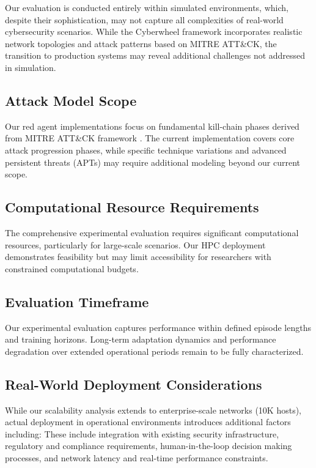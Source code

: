\documentclass[12pt,oneside]{article}
\begin{document}
Our evaluation is conducted entirely within simulated environments, which, despite their sophistication, may not capture all complexities of real-world cybersecurity scenarios. While the Cyberwheel framework incorporates realistic network topologies and attack patterns based on MITRE ATT\&CK, the transition to production systems may reveal additional challenges not addressed in simulation.

\subsection{Attack Model Scope}

Our red agent implementations focus on fundamental kill-chain phases derived from MITRE ATT\&CK framework \cite{mitre_attack_2023}. The current implementation covers core attack progression phases, while specific technique variations and advanced persistent threats (APTs) may require additional modeling beyond our current scope.

\subsection{Computational Resource Requirements}

The comprehensive experimental evaluation requires significant computational resources, particularly for large-scale scenarios. Our HPC deployment demonstrates feasibility but may limit accessibility for researchers with constrained computational budgets.

\subsection{Evaluation Timeframe}

Our experimental evaluation captures performance within defined episode lengths and training horizons. Long-term adaptation dynamics and performance degradation over extended operational periods remain to be fully characterized.

\subsection{Real-World Deployment Considerations}

While our scalability analysis extends to enterprise-scale networks (10K hosts), actual deployment in operational environments introduces additional factors including:
These include integration with existing security infrastructure, regulatory and compliance requirements, human-in-the-loop decision making processes, and network latency and real-time performance constraints.
\end{document}

